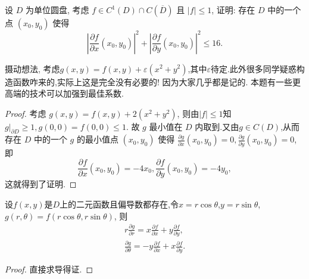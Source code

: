 \documentclass[../../main.tex]{subfiles}
\begin{document}
\begin{example}
设 \( D \) 为单位圆盘, 考虑 \( f \in C^1(D) \cap C(\overline{D}) \) 且 \( |f| \leqslant 1 \), 证明: 存在 \( D \) 中的一个点 \( (x_0, y_0) \) 使得
\[
\left| \frac{\partial f}{\partial x}(x_0, y_0) \right|^2 + \left| \frac{\partial f}{\partial y}(x_0, y_0) \right|^2 \leqslant 16 .
\]
\end{example}
\begin{note}
摄动想法, 考虑$g(x,y)=f(x,y)+\varepsilon (x^2+y^2)$,其中$\varepsilon$待定.此外很多同学疑惑构造函数咋来的,实际上这是完全没有必要的! 因为大家几乎都是记的. 本题有一些更高端的技术可以加强到最佳系数.
\end{note}
\begin{proof}
考虑 \( g(x, y) = f(x, y) + 2(x^2 + y^2) \), 则由$|f|\leqslant 1$知\( g|_{\partial D} \geqslant 1, g(0, 0)=f(0,0) \leqslant 1 \). 故 \( g \) 最小值在 \( D \) 内取到.又由$g\in C(D)$,从而存在 \( D \) 中的一个 \( g \) 的最小值点 \( (x_0, y_0) \) 使得 \( \frac{\partial g}{\partial x}(x_0, y_0) = 0, \frac{\partial g}{\partial y}(x_0, y_0) = 0 \), 即
\[
\frac{\partial f}{\partial x}(x_0, y_0) = -4x_0, \frac{\partial f}{\partial y}(x_0, y_0) = -4y_0,
\]
这就得到了证明.
\end{proof}

\begin{proposition}\label{proposition:极坐标变换偏导数相关结论}
设$f(x,y)$是$D$上的二元函数且偏导数都存在,令$x=r\cos \theta$,$y=r\sin \theta$,\( g(r, \theta) = f(r \cos \theta, r \sin \theta) \), 则
\begin{gather*}
r \frac{\partial g}{\partial r} = x \frac{\partial f}{\partial x} + y \frac{\partial f}{\partial y},
\\
\frac{\partial g}{\partial \theta} = -y \frac{\partial f}{\partial x} + x \frac{\partial f}{\partial y}.
\end{gather*}
\end{proposition}
\begin{proof}
直接求导得证.
\end{proof}
\end{document}
